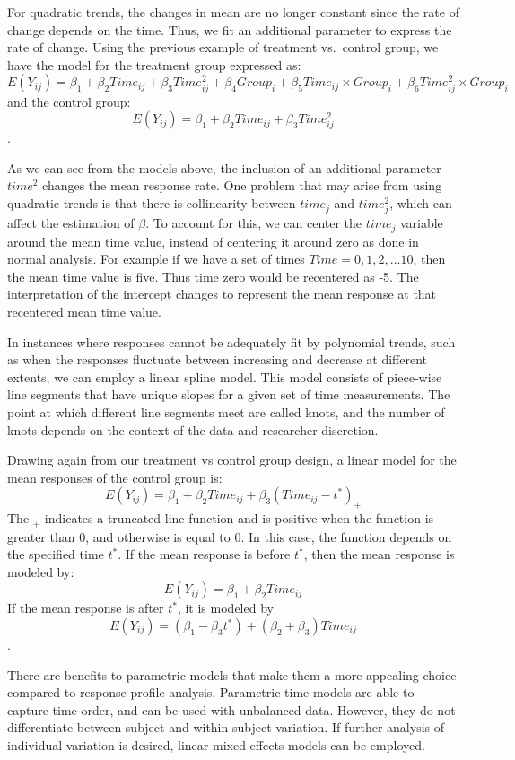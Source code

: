 \documentclass[12pt, twoside]{amherstthesis}
\theoremstyle{definition}
\theoremstyle{definition}
\theoremstyle{definition}
\theoremstyle{remark}
\begin{document}
For quadratic trends, the changes in mean are no longer constant since the rate of change depends on the time. Thus, we fit an additional parameter to express the rate of change.
Using the previous example of treatment vs.~control group, we have the model for the treatment group expressed as:
\[E(Y_{ij}) = \beta_1 + \beta_2Time_{ij}+\beta_3Time^2_{ij}+\beta_4Group_i + \beta_5Time_{ij} \times Group_i + \beta_6Time^2_{ij} \times Group_i\] and the control group: \[E(Y_{ij}) = \beta_1 + \beta_2Time_{ij}+\beta_3Time^2_{ij}\].

As we can see from the models above, the inclusion of an additional parameter \(time^2\) changes the mean response rate. One problem that may arise from using quadratic trends is that there is collinearity between \(time_j\) and \(time^2_j\), which can affect the estimation of \(\beta\). To account for this, we can center the \(time_j\) variable around the mean time value, instead of centering it around zero as done in normal analysis. For example if we have a set of times \(Time = {0,1,2,...10}\), then the mean time value is five. Thus time zero would be recentered as -5. The interpretation of the intercept changes to represent the mean response at that recentered mean time value.

In instances where responses cannot be adequately fit by polynomial trends, such as when the responses fluctuate between increasing and decrease at different extents, we can employ a linear spline model. This model consists of piece-wise line segments that have unique slopes for a given set of time measurements. The point at which different line segments meet are called knots, and the number of knots depends on the context of the data and researcher discretion.

Drawing again from our treatment vs control group design, a linear model for the mean responses of the control group is: \[E(Y_{ij}) = \beta_1 + \beta_2Time_{ij}+ \beta_3(Time_{ij}-t^*)_+\] The \(_+\) indicates a truncated line function and is positive when the function is greater than 0, and otherwise is equal to 0. In this case, the function depends on the specified time \(t^*\). If the mean response is before \(t^*\), then the mean response is modeled by: \[E(Y_{ij}) = \beta_1 + \beta_2Time_{ij}\] If the mean response is after \(t^*\), it is modeled by
\[E(Y_{ij}) = (\beta_1-\beta_3t^*) + (\beta_2+\beta_3)Time_{ij}\].

There are benefits to parametric models that make them a more appealing choice compared to response profile analysis. Parametric time models are able to capture time order, and can be used with unbalanced data. However, they do not differentiate between subject and within subject variation. If further analysis of individual variation is desired, linear mixed effects models can be employed.
\end{document}
